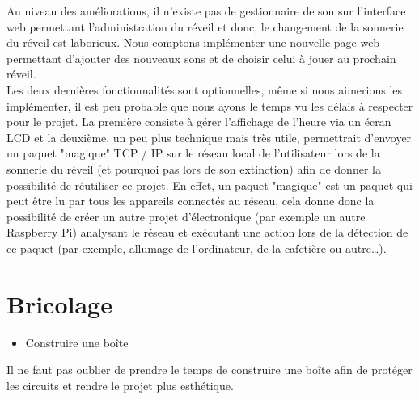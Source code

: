 Au niveau des améliorations, il n'existe pas de gestionnaire de son sur l'interface web permettant l'administration du réveil et donc, le changement de la sonnerie du réveil est laborieux. Nous comptons implémenter une nouvelle page web permettant d'ajouter des nouveaux sons et de choisir celui à jouer au prochain réveil. \\

Les deux dernières fonctionnalités sont optionnelles, même si nous aimerions les implémenter, il est peu probable que nous ayons le temps vu les délais à respecter pour le projet. La première consiste à gérer l'affichage de l'heure via un écran LCD et la deuxième, un peu plus technique mais très utile, permettrait d'envoyer un paquet "magique" TCP / IP sur le réseau local de l'utilisateur lors de la sonnerie du réveil (et pourquoi pas lors de son extinction) afin de donner la possibilité de réutiliser ce projet. En effet, un paquet "magique" est un paquet qui peut être lu par tous les appareils connectés au réseau, cela donne donc la possibilité de créer un autre projet d'électronique (par exemple un autre Raspberry Pi) analysant le réseau et exécutant une action lors de la détection de ce paquet (par exemple, allumage de l'ordinateur, de la cafetière ou autre\dots). \\


\section{Bricolage} %
\label{sec:bricolage}

\begin{itemize}
	\item Construire une boîte 
\end{itemize}
\vspace{20px}

Il ne faut pas oublier de prendre le temps de construire une boîte afin de protéger les circuits et rendre le projet plus esthétique. \\

